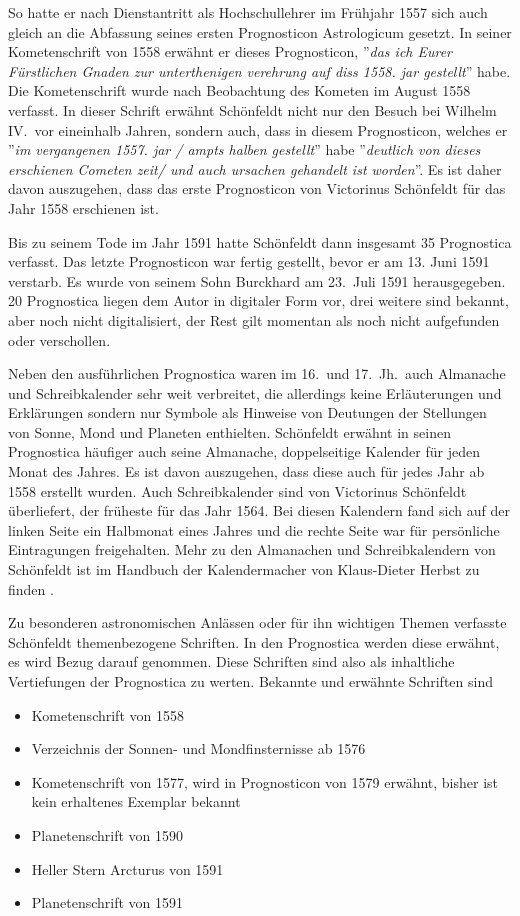 \documentclass[12pt]{article}
\begin{document}
So hatte er nach Dienstantritt als Hochschullehrer im Frühjahr 1557 sich auch gleich an die Abfassung seines ersten Prognosticon Astrologicum gesetzt. In seiner Kometenschrift von 1558 \cite{Schoenfeldt1558} erwähnt er dieses Prognosticon, ''\emph{das ich Eurer Fürstlichen Gnaden zur unterthenigen verehrung auf diss 1558. jar gestellt}'' habe. Die Kometenschrift wurde nach Beobachtung des Kometen im August 1558 verfasst. In dieser Schrift erwähnt Schönfeldt nicht nur den Besuch bei Wilhelm IV.\ vor eineinhalb Jahren, sondern auch, dass in diesem Prognosticon, welches er ''\emph{im vergangenen 1557. jar / ampts halben gestellt}'' habe ''\emph{deutlich von dieses erschienen Cometen zeit/ und auch ursachen gehandelt ist worden}''.
Es ist daher davon auszugehen, dass das erste Prognosticon von Victorinus Schönfeldt für das Jahr 1558 erschienen ist. 

Bis zu seinem Tode im Jahr 1591 hatte Schönfeldt dann insgesamt 35 Prognostica verfasst. Das letzte Prognosticon war fertig gestellt, bevor er am 13. Juni 1591 verstarb. Es wurde von seinem Sohn Burckhard am 23.\ Juli 1591 herausgegeben. 20 Prognostica liegen dem Autor in digitaler Form vor, drei weitere sind bekannt, aber noch nicht digitalisiert, der Rest gilt momentan als noch nicht aufgefunden oder verschollen.

Neben den ausführlichen Prognostica waren im 16.\ und 17.\ Jh.\ auch Almanache und Schreibkalender sehr weit verbreitet, die allerdings keine Erläuterungen und Erklärungen sondern nur Symbole als Hinweise von Deutungen der Stellungen von Sonne, Mond und Planeten enthielten. Schönfeldt erwähnt in seinen Prognostica häufiger auch seine Almanache, doppelseitige Kalender für jeden Monat des Jahres. Es ist davon auszugehen, dass diese auch für jedes Jahr ab 1558 erstellt wurden. Auch Schreibkalender sind von Victorinus Schönfeldt überliefert, der früheste für das Jahr 1564. Bei diesen Kalendern fand sich auf der linken Seite ein Halbmonat eines Jahres und die rechte Seite war für persönliche Eintragungen freigehalten.
Mehr zu den Almanachen und Schreibkalendern von Schönfeldt ist im Handbuch der Kalendermacher von Klaus-Dieter Herbst zu finden \cite{Herbst}.

Zu besonderen astronomischen Anlässen oder für ihn wichtigen Themen verfasste Schönfeldt themenbezogene Schriften. In den Prognostica werden diese erwähnt, es wird Bezug darauf genommen. Diese Schriften sind also als inhaltliche Vertiefungen der Prognostica zu werten. Bekannte und erwähnte Schriften sind 
\begin{itemize}
	\item Kometenschrift von 1558 \cite{Schoenfeldt1558}
	\item Verzeichnis der Sonnen- und Mondfinsternisse ab 1576 \cite{Schoenfeldt1575}
	\item Kometenschrift von 1577, wird in Prognosticon von 1579 erwähnt, bisher ist kein erhaltenes Exemplar bekannt
	\item Planetenschrift von 1590 \cite{Schoenfeldt1590b}
	\item Heller Stern Arcturus von 1591 \cite{Schoenfeldt1591b}
	\item Planetenschrift von 1591 \cite{Schoenfeldt1591c}
\end{itemize}
\end{document}
